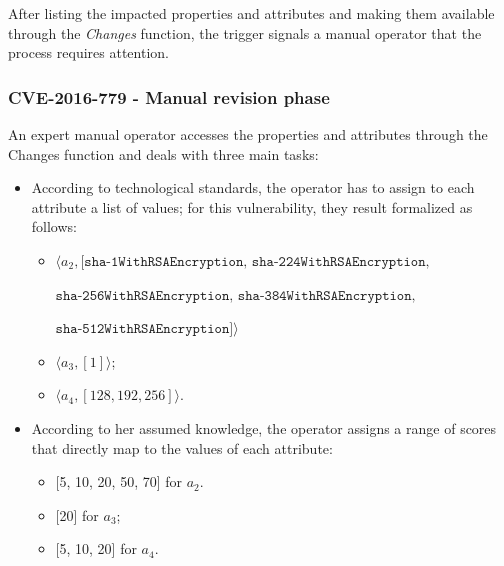 After listing the impacted properties and attributes and making them available through the \textit{Changes} function, the trigger signals a manual operator that the process requires attention.

\subsubsection{CVE-2016-779 - Manual revision phase}
An expert manual operator accesses the properties and attributes through the Changes function and deals with three main tasks:
\begin{itemize}
    \item According to technological standards, the operator has to assign to each attribute a list of values; for this vulnerability, they result formalized as follows:
    \begin{itemize}
        \item \(\langle a_2, [\texttt{sha-1WithRSAEncryption, sha-224WithRSAEncryption,}\)
        
        \(\texttt{sha-256WithRSAEncryption, sha-384WithRSAEncryption,} \)
        
        \(\texttt{sha-512WithRSAEncryption}]\rangle\)
        \item \(\langle a_3, [1] \rangle\);
        \item \(\langle a_4, [128, 192, 256] \rangle\).
    \end{itemize}
    
    \item According to her assumed knowledge, the operator assigns a range of scores that directly map to the values of each attribute:
    \begin{itemize}
        \item {[5, 10, 20, 50, 70]} for \(a_2\).
        \item {[20]} for \(a_3\);
        \item {[5, 10, 20]} for \(a_4\).
    \end{itemize}
    
\end{itemize}


